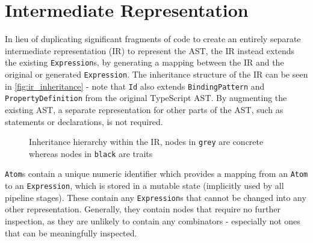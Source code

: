 \section{Intermediate Representation}
\label{sec:ir}

In lieu of duplicating significant fragments of code to create an entirely separate intermediate representation (IR) to represent the AST, the IR instead extends the existing \texttt{Expression}s, by generating a mapping between the IR and the original or generated \texttt{Expression}.
The inheritance structure of the IR can be seen in \autoref{fig:ir_inheritance} - note that \texttt{Id} also extends \texttt{BindingPattern} and \texttt{PropertyDefinition} from the original TypeScript AST.
By augmenting the existing AST, a separate representation for other parts of the AST, such as statements or declarations, is not required.

\begin{figure}[H]
    \centering
    \caption{Inheritance hierarchy within the IR, nodes in \textcolor{black!50}{\texttt{grey}} are concrete whereas nodes in \texttt{black} are traits}
    \label{fig:ir_inheritance}
\end{figure}

\texttt{Atom}s contain a unique numeric identifier which provides a mapping from an \texttt{Atom} to an \texttt{Expression}, which is stored in a mutable state (implicitly used by all pipeline stages).
These contain any \texttt{Expression}s that cannot be changed into any other representation.
Generally, they contain nodes that require no further inspection, as they are unlikely to contain any combinators - especially not ones that can be meaningfully inspected.


